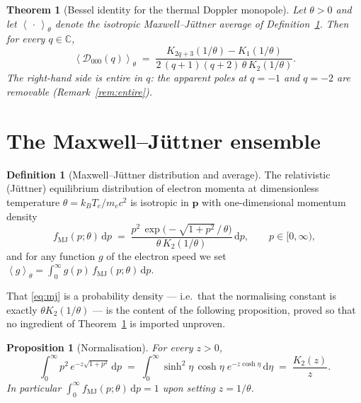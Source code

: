 \documentclass[11pt]{article}
\newtheorem{theorem}{Theorem}
\newtheorem{proposition}{Proposition}
\theoremstyle{definition}
\newtheorem{definition}{Definition}
\theoremstyle{remark}
\newcommand{\dd}{\mathrm{d}}
\newcommand{\Do}{\mathcal{D}}
\newcommand{\avg}[1]{\left\langle #1 \right\rangle}
\newcommand{\Cx}{\mathbb{C}}
\begin{document}
\begin{theorem}[Bessel identity for the thermal Doppler monopole]
\label{thm:main}
Let $\theta>0$ and let $\avg{\,\cdot\,}_\theta$ denote the isotropic Maxwell--J\"uttner average of
Definition~\ref{def:mj}. Then for every $q\in\Cx$,
\begin{equation}
  \avg{\Do_{000}(q)}_\theta
  \;=\;
  \frac{K_{2q+3}\!\left(1/\theta\right)-K_{1}\!\left(1/\theta\right)}
       {2\,(q+1)(q+2)\,\theta\,K_{2}\!\left(1/\theta\right)} .
  \label{eq:main}
\end{equation}
The right-hand side is entire in $q$: the apparent poles at $q=-1$ and $q=-2$ are removable
(Remark~\ref{rem:entire}).
\end{theorem}

\section{The Maxwell--J\"uttner ensemble}
\label{sec:mj}

\begin{definition}[Maxwell--J\"uttner distribution and average]
\label{def:mj}
The relativistic (J\"uttner) equilibrium distribution of electron momenta at dimensionless temperature
$\theta=k_BT_e/m_ec^2$ is isotropic in $\bm p$ with one-dimensional momentum density
\begin{equation}
  f_{\mathrm{MJ}}(p;\theta)\,\dd p
  \;=\;
  \frac{p^{2}\,\exp\!\big(-\sqrt{1+p^{2}}\,/\,\theta\big)}{\theta\,K_{2}(1/\theta)}\,\dd p ,
  \qquad p\in[0,\infty),
  \label{eq:mj}
\end{equation}
and for any function $g$ of the electron speed we set
$\displaystyle \avg{g}_\theta=\int_0^\infty g(p)\,f_{\mathrm{MJ}}(p;\theta)\,\dd p.$
\end{definition}

That \eqref{eq:mj} is a probability density --- i.e.\ that the normalising constant is exactly
$\theta K_2(1/\theta)$ --- is the content of the following proposition, proved so that no ingredient of
Theorem~\ref{thm:main} is imported unproven.

\begin{proposition}[Normalisation]
\label{prop:norm}
For every $z>0$,
\begin{equation}
  \int_0^\infty p^{2}\,e^{-z\sqrt{1+p^2}}\,\dd p
  \;=\;\int_0^\infty \sinh^{2}\eta\,\cosh\eta\;e^{-z\cosh\eta}\,\dd\eta
  \;=\;\frac{K_2(z)}{z}.
  \label{eq:norm}
\end{equation}
In particular $\int_0^\infty f_{\mathrm{MJ}}(p;\theta)\,\dd p=1$ upon setting $z=1/\theta$.
\end{proposition}
\end{document}
